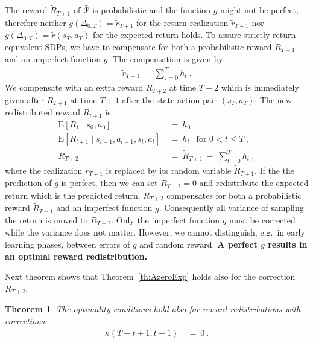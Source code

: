 \documentclass{article}
\newtheorem{theoremA}{Theorem}
\newcommand\EXP{\mathbf{\mathrm{E}}}
\renewcommand{\leq}{\leqslant}
\begin{document}
\begin{appendices}
The reward $\tilde{R}_{T+1}$ of $\tilde{\mathcal{P}}$
is probabilistic and 
the function $g$ might not be perfect,
therefore neither $g(\Delta_{0:T}) = \tilde{r}_{T+1}$ for the return
realization $\tilde{r}_{T+1}$ nor
$g(\Delta_{0:T}) = \tilde{r}(s_T,a_T)$ for the expected return
holds.
To assure strictly return-equivalent SDPs,
we have to compensate for both a probabilistic reward $\tilde{R}_{T+1}$ 
and an imperfect function $g$.
The compensation is given by
\begin{align}
  \tilde{r}_{T+1} \ - \ \sum_{\tau=0}^T h_t \ .
\end{align} 
We compensate with an extra reward $R_{T+2}$ at time $T+2$ 
which is immediately given
after $R_{T+1}$ at time $T+1$ after the state-action pair $(s_T,a_T)$.
The new redistributed reward $R_{t+1}$ is 
\begin{align}
   \EXP \left[ R_1 \mid s_0,a_0 \right] \ &= \ h_0  \ , \\
   \EXP \left[ R_{t+1} \mid s_{t-1},a_{t-1},s_t,a_t \right] 
   \ &= \ h_t  \  \ \text{ for } 0 < t \leq T \ , \\
   R_{T+2}  \ &= \ 
   \tilde{R}_{T+1} \ - \ \sum_{t=0}^T h_t  \ ,
\end{align}
where the realization $\tilde{r}_{T+1}$ is replaced by its
random variable $\tilde{R}_{T+1}$.
If the the prediction of $g$ is perfect, then we can set
$R_{T+2}=0$ and redistribute the expected return which is
the predicted return.
$R_{T+2}$ compensates for both a probabilistic reward $\tilde{R}_{T+1}$ 
and an imperfect function $g$.
Consequently all variance of sampling the return is moved to  $R_{T+2}$.
Only the imperfect function $g$ must be corrected while the variance
does not matter. 
However, we cannot distinguish, e.g.\ in early learning phases, 
between errors of $g$ and random reward. 
{\bf A perfect $g$ results in an optimal reward redistribution.}

Next theorem
shows that Theorem~\ref{th:AzeroExp} holds also for
the correction $R_{T+2}$. 
\begin{theoremA}
\label{th:AzeroExpCorr}
The optimality conditions
hold also for reward redistributions with corrections:
\begin{align}
\label{eq:AoptimalCon2}
  \kappa(T-t+1,t-1) \ &= \  0 \ . 
\end{align} 
\end{theoremA}


\end{appendices}
\end{document}
